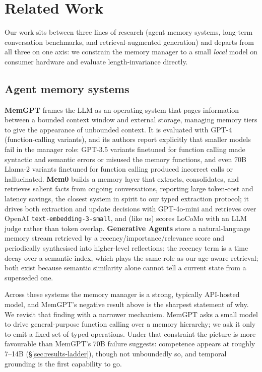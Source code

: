 \section{Related Work}
\label{sec:related}

Our work sits between three lines of research (agent memory systems, long-term
conversation benchmarks, and retrieval-augmented generation) and departs from
all three on one axis: we constrain the memory manager to a small \emph{local} model
on consumer hardware and evaluate length-invariance directly.

\subsection{Agent memory systems}

\textbf{MemGPT} \citep{packer2023memgpt} frames the LLM as an operating system that
pages information between a bounded context window and external storage,
managing memory tiers to give the appearance of unbounded context. It is
evaluated with GPT-4 (function-calling variants), and its authors report
explicitly that smaller models fail in the manager role: GPT-3.5 variants
finetuned for function calling made syntactic and semantic errors or misused the
memory functions, and even 70B Llama-2 variants finetuned for function calling
produced incorrect calls or hallucinated. \textbf{Mem0}
\citep{chhikara2025mem0} builds a memory layer that extracts, consolidates, and
retrieves salient facts from ongoing conversations, reporting large token-cost
and latency savings, the closest system in spirit to our typed extraction
protocol; it drives both extraction and update decisions with GPT-4o-mini and
retrieves over OpenAI \texttt{text-embedding-3-small}, and (like us) scores
LoCoMo with an LLM judge rather than token overlap. \textbf{Generative Agents}
\citep{park2023generative} store a natural-language
memory stream retrieved by a recency/importance/relevance score and periodically
synthesised into higher-level reflections; the recency term is a time decay over
a semantic index, which plays the same role as our age-aware retrieval; both
exist because semantic similarity alone cannot tell a current state from a
superseded one.

Across these systems the memory manager is a strong, typically API-hosted
model, and MemGPT's negative result above is the sharpest statement of why. We
revisit that finding with a narrower mechanism. MemGPT asks a small model to
drive general-purpose function calling over a memory hierarchy; we ask it only
to emit a fixed set of typed operations. Under that constraint the picture is
more favourable than MemGPT's 70B failure suggests: competence appears at
roughly 7--14B (\S\ref{sec:results-ladder}), though not unboundedly so, and
temporal grounding is the first capability to go.

